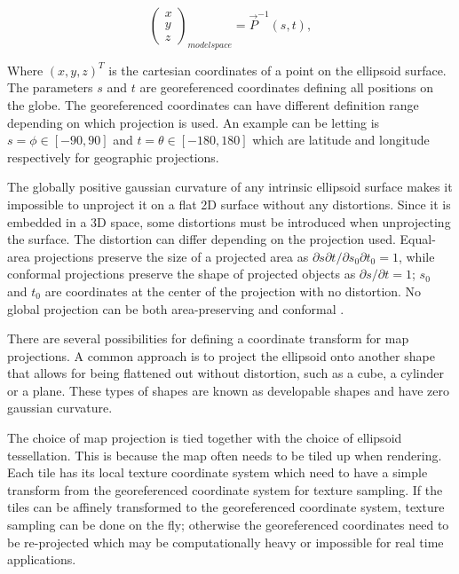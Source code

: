 \begin{equation}
\label{eq:invproj}
\begin{pmatrix} x \\ y \\ z \end{pmatrix}_{ modelspace }=\vec { P }^{-1} (s ,t ),
\end{equation}

Where $(x,y,z)^T$ is the cartesian coordinates of a point on the ellipsoid surface. The parameters $s$ and $t$ are georeferenced coordinates defining all positions on the globe. The georeferenced coordinates can have different definition range depending on which projection is used. An example can be letting is $s = \phi \in [-90,90]$ and $t = \theta \in [-180,180]$ which are latitude and longitude respectively for geographic projections.

The globally positive gaussian curvature of any intrinsic ellipsoid surface makes it impossible to unproject it on a flat 2D surface without any distortions. Since it is embedded in a 3D space, some distortions must be introduced when unprojecting the surface. The distortion can differ depending on the projection used. Equal-area projections preserve the size of a projected area as $\partial s \partial t / \partial s_0 \partial t_0 = 1$, while conformal projections preserve the shape of projected objects as $\partial s / \partial t = 1$; $s_0$ and $t_0$ are coordinates at the center of the projection with no distortion. No global projection can be both area-preserving and conformal \cite{dimi15}.

There are several possibilities for defining a coordinate transform for map projections. A common approach is to project the ellipsoid onto another shape that allows for being flattened out without distortion, such as a cube, a cylinder or a plane. These types of shapes are known as developable shapes and have zero gaussian curvature.

The choice of map projection is tied together with the choice of ellipsoid tessellation. This is because the map often needs to be tiled up when rendering. Each tile has its local texture coordinate system which need to have a simple transform from the georeferenced coordinate system for texture sampling. If the tiles can be affinely transformed to the georeferenced coordinate system, texture sampling can be done on the fly; otherwise the georeferenced coordinates need to be re-projected which may be computationally heavy or impossible for real time applications.

